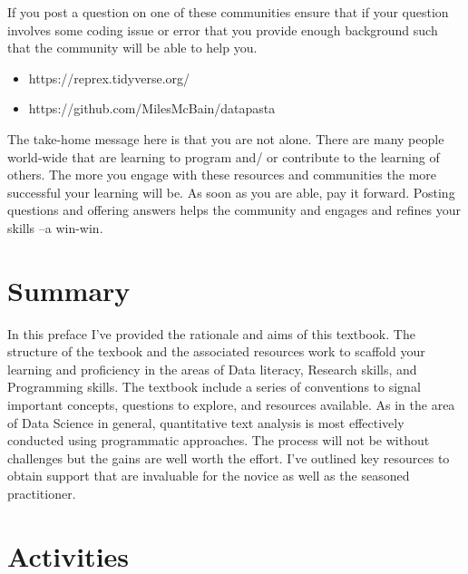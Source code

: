 \documentclass[
  letterpaper,
]{latex/krantz}
\begin{document}
If you post a question on one of these communities ensure that if your
question involves some coding issue or error that you provide enough
background such that the community will be able to help you.

\begin{itemize}
\item
  https://reprex.tidyverse.org/
\item
  https://github.com/MilesMcBain/datapasta
\end{itemize}

The take-home message here is that you are not alone. There are many
people world-wide that are learning to program and/ or contribute to the
learning of others. The more you engage with these resources and
communities the more successful your learning will be. As soon as you
are able, pay it forward. Posting questions and offering answers helps
the community and engages and refines your skills --a win-win.

\hypertarget{summary}{%
\section*{Summary}\label{summary}}


In this preface I've provided the rationale and aims of this textbook.
The structure of the texbook and the associated resources work to
scaffold your learning and proficiency in the areas of Data literacy,
Research skills, and Programming skills. The textbook include a series
of conventions to signal important concepts, questions to explore, and
resources available. As in the area of Data Science in general,
quantitative text analysis is most effectively conducted using
programmatic approaches. The process will not be without challenges but
the gains are well worth the effort. I've outlined key resources to
obtain support that are invaluable for the novice as well as the
seasoned practitioner.

\hypertarget{activities}{%
\section*{Activities}\label{activities}}

\end{document}
